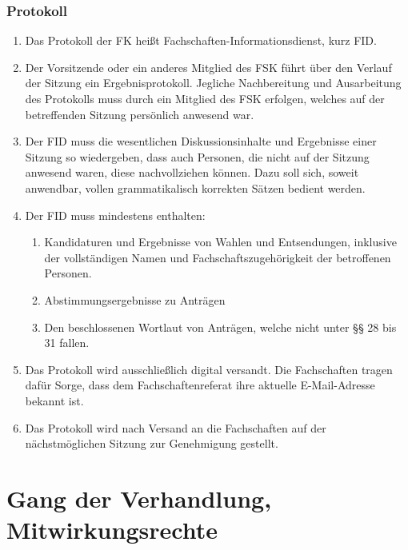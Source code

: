 \documentclass{article}
\begin{document}
\section{Protokoll}
\begin{enumerate}[(1)]
    \item Das Protokoll der FK heißt Fachschaften-Informationsdienst, kurz FID.
    \item Der Vorsitzende oder ein anderes Mitglied des FSK führt über den Verlauf der Sitzung ein Ergebnisprotokoll. 
    	Jegliche Nachbereitung und Ausarbeitung des Protokolls muss durch ein Mitglied des FSK erfolgen, welches auf der betreffenden Sitzung persönlich anwesend war.
    \item Der FID muss die wesentlichen Diskussionsinhalte und Ergebnisse einer Sitzung so wiedergeben, dass auch Personen, die nicht auf der Sitzung anwesend waren, diese nachvollziehen können. 
    	Dazu soll sich, soweit anwendbar, vollen grammatikalisch korrekten Sätzen bedient werden.
    \item Der FID muss mindestens enthalten:
    \begin{enumerate}[1.]
        \item Kandidaturen und Ergebnisse von Wahlen und Entsendungen, inklusive der vollständigen Namen und Fachschaftszugehörigkeit der betroffenen Personen.
        \item Abstimmungsergebnisse zu Anträgen
        \item Den beschlossenen Wortlaut von Anträgen, welche nicht unter §§ 28 bis 31 fallen.
    \end{enumerate}
    \item Das Protokoll wird ausschließlich digital versandt.
    	Die Fachschaften tragen dafür Sorge, dass dem Fachschaftenreferat ihre aktuelle E-Mail-Adresse bekannt ist.
    \item Das Protokoll wird nach Versand an die Fachschaften auf der nächstmöglichen Sitzung zur Genehmigung gestellt.
\end{enumerate}

\part{Gang der Verhandlung, Mitwirkungsrechte}
\end{document}
